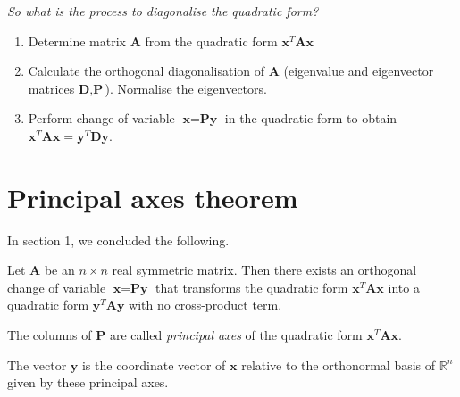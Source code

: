 \documentclass[a4paper]{article}
\numberwithin{equation}{section} %
\newcommand{\setRn}{\mathbb{R}^n} %
\begin{document}
\faQuestionCircle \textit{ So what is the process to diagonalise the quadratic form?}
\begin{addmargin}[2em]{0em}%
  \begin{enumerate}
  \item Determine matrix $\textbf{A}$ from the quadratic form $\textbf{x}^{T}\textbf{Ax}$
  \item Calculate the orthogonal diagonalisation of $\textbf{A}$ (eigenvalue and eigenvector matrices $\textbf{D}, \textbf{P}$). Normalise the eigenvectors.
  \item Perform change of variable $\textbf{x}=\textbf{Py}$ in the quadratic form to obtain $\textbf{x}^{T}\textbf{Ax}=\textbf{y}^{T}\textbf{Dy}$.
  \end{enumerate}
\end{addmargin}



\section{Principal axes theorem}
In section 1, we concluded the following.

\begin{shaded*}
  \begin{theorem}
  Let $\textbf{A}$ be an $n\times n$ real symmetric matrix. Then there exists an orthogonal change of variable $\textbf{x}=\textbf{Py}$ that transforms the quadratic form $\textbf{x}^{T}\textbf{Ax}$ into a quadratic form $\textbf{y}^{T}\textbf{Ay}$ with no cross-product term.
  \end{theorem}
\end{shaded*}

\begin{shaded*}
\begin{definition}
The columns of $\textbf{P}$ are called \textit{principal axes}  of the quadratic form $\textbf{x}^{T}\textbf{Ax}$.
\end{definition}
\end{shaded*}

The vector $\textbf{y}$ is the coordinate vector of $\textbf{x}$ relative to the orthonormal basis of $\setRn$ given by these principal axes.
\end{document}
